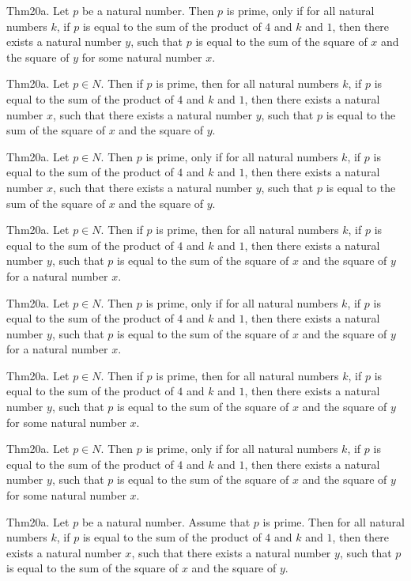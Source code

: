 \documentclass{article}
\begin{document}
Thm20a. Let $p$ be a natural number. Then $p$ is prime, only if for all natural numbers $k$, if $p$ is equal to the sum of the product of $4$ and $k$ and $1$, then there exists a natural number $y$, such that $p$ is equal to the sum of the square of $x$ and the square of $y$ for some natural number $x$.

Thm20a. Let $p \in N$. Then if $p$ is prime, then for all natural numbers $k$, if $p$ is equal to the sum of the product of $4$ and $k$ and $1$, then there exists a natural number $x$, such that there exists a natural number $y$, such that $p$ is equal to the sum of the square of $x$ and the square of $y$.

Thm20a. Let $p \in N$. Then $p$ is prime, only if for all natural numbers $k$, if $p$ is equal to the sum of the product of $4$ and $k$ and $1$, then there exists a natural number $x$, such that there exists a natural number $y$, such that $p$ is equal to the sum of the square of $x$ and the square of $y$.

Thm20a. Let $p \in N$. Then if $p$ is prime, then for all natural numbers $k$, if $p$ is equal to the sum of the product of $4$ and $k$ and $1$, then there exists a natural number $y$, such that $p$ is equal to the sum of the square of $x$ and the square of $y$ for a natural number $x$.

Thm20a. Let $p \in N$. Then $p$ is prime, only if for all natural numbers $k$, if $p$ is equal to the sum of the product of $4$ and $k$ and $1$, then there exists a natural number $y$, such that $p$ is equal to the sum of the square of $x$ and the square of $y$ for a natural number $x$.

Thm20a. Let $p \in N$. Then if $p$ is prime, then for all natural numbers $k$, if $p$ is equal to the sum of the product of $4$ and $k$ and $1$, then there exists a natural number $y$, such that $p$ is equal to the sum of the square of $x$ and the square of $y$ for some natural number $x$.

Thm20a. Let $p \in N$. Then $p$ is prime, only if for all natural numbers $k$, if $p$ is equal to the sum of the product of $4$ and $k$ and $1$, then there exists a natural number $y$, such that $p$ is equal to the sum of the square of $x$ and the square of $y$ for some natural number $x$.

Thm20a. Let $p$ be a natural number. Assume that $p$ is prime. Then for all natural numbers $k$, if $p$ is equal to the sum of the product of $4$ and $k$ and $1$, then there exists a natural number $x$, such that there exists a natural number $y$, such that $p$ is equal to the sum of the square of $x$ and the square of $y$.
\end{document}
